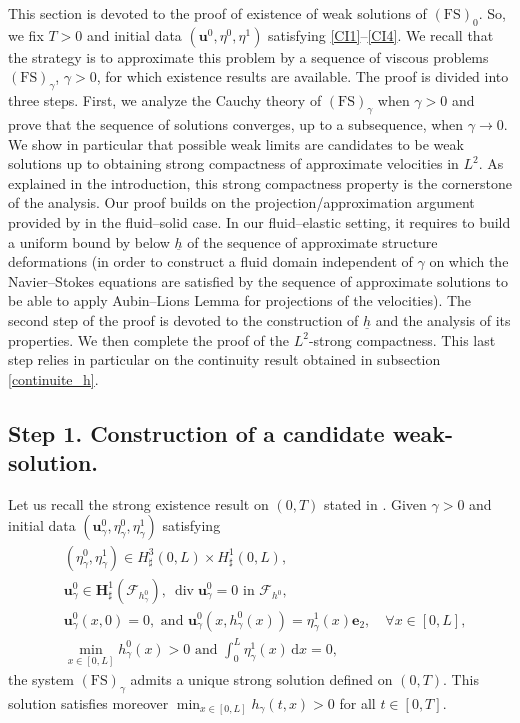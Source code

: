 \documentclass[JEP,XML,SOM,Unicode,NoFloatCountersInSection]{cedram}
\let\mathcal\mathscr
\newcommand{\FS}{\mathrm{FS}}
\theoremstyle{remark}
\theoremstyle{definition}
\newcommand{\ug}{\boldsymbol{u}}
\newcommand{\dd}{\,\mathrm{d}}
\DeclareMathOperator{\DIV}{div}
\newcommand{\BS}[1]{\boldsymbol{#1}}
\newcommand{\hb}{{\underline{h}}}
\begin{document}
This section is devoted to the proof of existence of weak solutions of $(\FS)_0$.
So, we fix $T>0$ and initial data $(\ug^0,\eta^0,\eta^1)$ satisfying \eqref{CI1}--\eqref{CI4}.
We recall that the strategy is to approximate this problem by a sequence of viscous problems $(\FS)_\gamma$, $\gamma>0$, for which existence results are available. The proof is divided into three steps. First, we analyze the Cauchy theory of $(\FS)_{\gamma}$ when $\gamma >0$ and prove that the sequence of solutions converges, up to a subsequence, when $\gamma \to 0$. We show in particular that possible weak limits are candidates to be weak solutions up to obtaining
strong compactness of approximate velocities in $L^2$. As explained in the introduction, this strong compactness property is the cornerstone of the analysis. Our proof builds on the projection/approximation argument provided by \cite{SanMartin-Starovoitov-Tucsnak}
in the fluid--solid case. In our fluid--elastic setting, it requires to build a uniform bound by below $\hb$ of the sequence
of approximate structure deformations (in order to construct a fluid domain independent of $\gamma$ on which the Navier--Stokes equations are satisfied by the sequence of approximate solutions to be able to apply Aubin--Lions Lemma for projections of the velocities). The second step of the proof is devoted to the construction of $\hb$ and
the analysis of its properties. We then complete the proof of the $L^2$-strong compactness. This last step relies in particular on the continuity result obtained in subsection \ref{continuite_h}.

\subsection{Step 1. Construction of a candidate weak-solution.}
\label{sec:proof1}
Let us recall the strong existence result on $(0,T)$ stated in \cite[Th.\,1]{Grandmont-Hillairet}.
Given $\gamma>0$ and initial data $(\ug_\gamma^{0},\eta_\gamma^{0},\eta_\gamma^{1})$ satisfying
\begin{align}
&(\eta_\gamma^{0},\eta_\gamma^{1})\in H^{3}_{\sharp}(0,L)\times H^{1}_{\sharp}(0,L),\label{CI-gamma1}\\
&\ug_\gamma^{0}\in \BS{H}_{\sharp}^{1}(\mathcal{F}_{h_{\gamma}^{0}}),\ \DIV{\ug_\gamma^{0}}=0\text{ in }\mathcal{F}_{h^{0}},\label{CI-gamma2}\\
&\ug_\gamma^{0}(x,0)=0, \text{ and }\ug_\gamma^{0}(x,h_\gamma^{0}(x))=\eta_\gamma^{1}(x)\BS{e}_{2},\quad \forall x\in [0,L],\label{CI-gamma3}\\
&\min_{x\in[0,L]}h_\gamma^{0}(x)>0\text{ and }\int_{0}^{L}\eta_\gamma^{1}(x)\dd x=0,\label{CI-gamma4}
\end{align}
the system $(\FS)_{\gamma}$ admits a unique strong solution defined on $(0, T)$. This solution satisfies moreover $\min_{x\in [0, L]} h_\gamma(t,x) >0$ for all $t\in [0, T]$.
\end{document}
